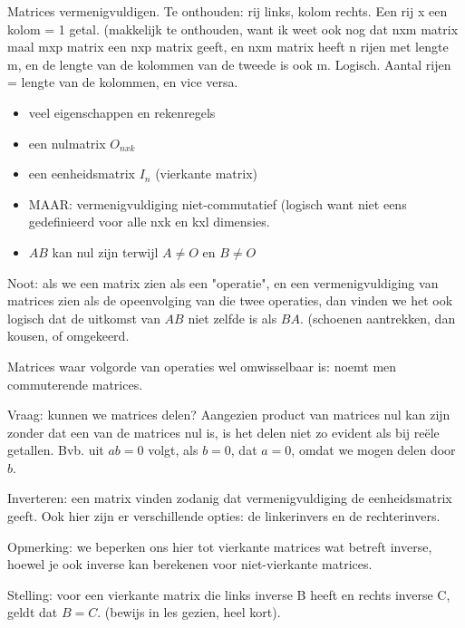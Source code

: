 \documentclass{article}
\begin{document}
Matrices vermenigvuldigen. Te onthouden: rij links, kolom rechts. Een rij x een kolom = 1 getal. (makkelijk te onthouden, want ik weet ook nog dat nxm matrix maal mxp matrix een nxp matrix geeft, en nxm matrix heeft n rijen met lengte m, en de lengte van de kolommen van de tweede is ook m. Logisch. Aantal rijen = lengte van de kolommen, en vice versa. 

% 


\begin{itemize}
    \item veel eigenschappen en rekenregels
    \item een nulmatrix $O_{nxk}$
    \item een eenheidsmatrix $I_n$ (vierkante matrix) 
    \item MAAR: vermenigvuldiging niet-commutatief (logisch want niet eens gedefinieerd voor alle nxk en kxl dimensies. 
    \item $AB$ kan nul zijn terwijl $A \neq O$ en $B \neq O$
\end{itemize}


Noot: als we een matrix zien als een "operatie", en een vermenigvuldiging van matrices zien als de opeenvolging van die twee operaties, dan vinden we het ook logisch dat de uitkomst van $AB$ niet zelfde is als $BA$. (schoenen aantrekken, dan kousen, of omgekeerd. 

Matrices waar volgorde van operaties wel omwisselbaar is: noemt men commuterende matrices. 

Vraag: kunnen we matrices delen? Aangezien product van matrices nul kan zijn zonder dat een van de matrices nul is, is het delen niet zo evident als bij re{\"e}le getallen. Bvb. uit $ab=0$ volgt, als $b=0$, dat $a=0$, omdat we mogen delen door $b$. 

Inverteren: een matrix vinden zodanig dat vermenigvuldiging de eenheidsmatrix geeft. Ook hier zijn er verschillende opties: de linkerinvers en de rechterinvers. 

Opmerking: we beperken ons hier tot vierkante matrices wat betreft inverse, hoewel je ook inverse kan berekenen voor niet-vierkante matrices. 

Stelling: voor een vierkante matrix die links inverse B heeft en rechts inverse C, geldt dat $B=C$. (bewijs in les gezien, heel kort). 
\end{document}
